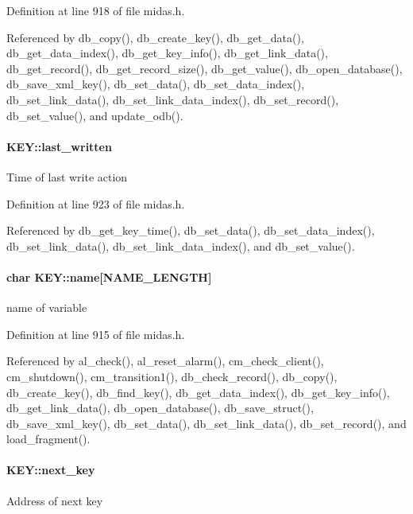 Definition at line 918 of file midas.h.

Referenced by db\_\-copy(), db\_\-create\_\-key(), db\_\-get\_\-data(), db\_\-get\_\-data\_\-index(), db\_\-get\_\-key\_\-info(), db\_\-get\_\-link\_\-data(), db\_\-get\_\-record(), db\_\-get\_\-record\_\-size(), db\_\-get\_\-value(), db\_\-open\_\-database(), db\_\-save\_\-xml\_\-key(), db\_\-set\_\-data(), db\_\-set\_\-data\_\-index(), db\_\-set\_\-link\_\-data(), db\_\-set\_\-link\_\-data\_\-index(), db\_\-set\_\-record(), db\_\-set\_\-value(), and update\_\-odb().
\paragraph[{last\_\-written}]{ {\bf KEY::last\_\-written}}\hfill\label{structKEY_a6b30a678557dddfc00f2da8b6a416225}
Time of last write action 

Definition at line 923 of file midas.h.

Referenced by db\_\-get\_\-key\_\-time(), db\_\-set\_\-data(), db\_\-set\_\-data\_\-index(), db\_\-set\_\-link\_\-data(), db\_\-set\_\-link\_\-data\_\-index(), and db\_\-set\_\-value().
\paragraph[{name}]{\setlength{\rightskip}{0pt plus 5cm}char {\bf KEY::name}\mbox{[}NAME\_\-LENGTH\mbox{]}}\hfill\label{structKEY_aab4927ab8eb9921525d82761adb11f5c}
name of variable 

Definition at line 915 of file midas.h.

Referenced by al\_\-check(), al\_\-reset\_\-alarm(), cm\_\-check\_\-client(), cm\_\-shutdown(), cm\_\-transition1(), db\_\-check\_\-record(), db\_\-copy(), db\_\-create\_\-key(), db\_\-find\_\-key(), db\_\-get\_\-data\_\-index(), db\_\-get\_\-key\_\-info(), db\_\-get\_\-link\_\-data(), db\_\-open\_\-database(), db\_\-save\_\-struct(), db\_\-save\_\-xml\_\-key(), db\_\-set\_\-data(), db\_\-set\_\-link\_\-data(), db\_\-set\_\-record(), and load\_\-fragment().
\paragraph[{next\_\-key}]{ {\bf KEY::next\_\-key}}\hfill\label{structKEY_ab8303fc464bc3f0c1d75544cef0a725d}
Address of next key 

